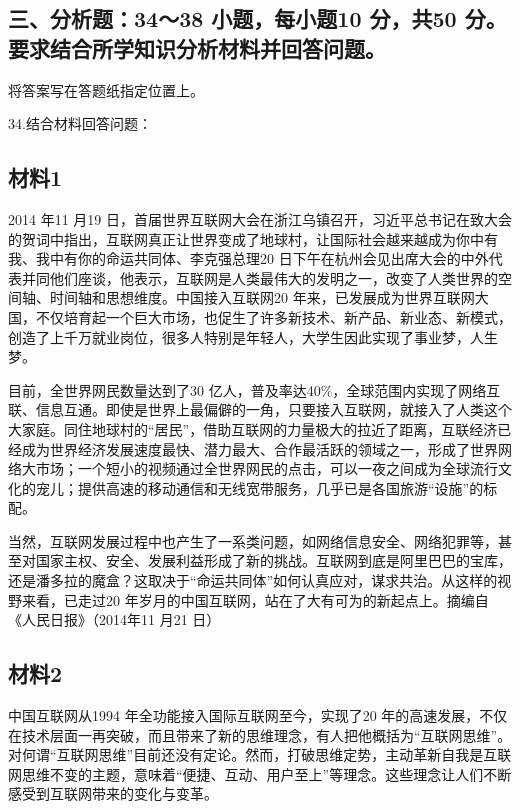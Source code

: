 \documentclass[UTF8,11pt]{ctexart}
\begin{document}
\subsection*{三、分析题：34～38 小题，每小题10 分，共50 分。要求结合所学知识分析材料并回答问题。}

将答案写在答题纸指定位置上。


34.结合材料回答问题：


\subsection*{材料1}

2014 年11 月19 日，首届世界互联网大会在浙江乌镇召开，习近平总书记在致大会的贺词中指出，互联网真正让世界变成了地球村，让国际社会越来越成为你中有我、我中有你的命运共同体、李克强总理20 日下午在杭州会见出席大会的中外代表并同他们座谈，他表示，互联网是人类最伟大的发明之一，改变了人类世界的空间轴、时间轴和思想维度。中国接入互联网20 年来，已发展成为世界互联网大国，不仅培育起一个巨大市场，也促生了许多新技术、新产品、新业态、新模式，创造了上千万就业岗位，很多人特别是年轻人，大学生因此实现了事业梦，人生梦。

目前，全世界网民数量达到了30 亿人，普及率达40\%，全球范围内实现了网络互联、信息互通。即使是世界上最偏僻的一角，只要接入互联网，就接入了人类这个大家庭。同住地球村的“居民”，借助互联网的力量极大的拉近了距离，互联经济已经成为世界经济发展速度最快、潜力最大、合作最活跃的领域之一，形成了世界网络大市场；一个短小的视频通过全世界网民的点击，可以一夜之间成为全球流行文化的宠儿；提供高速的移动通信和无线宽带服务，几乎已是各国旅游“设施”的标配。

当然，互联网发展过程中也产生了一系类问题，如网络信息安全、网络犯罪等，甚至对国家主权、安全、发展利益形成了新的挑战。互联网到底是阿里巴巴的宝库，还是潘多拉的魔盒？这取决于“命运共同体”如何认真应对，谋求共治。从这样的视野来看，已走过20 年岁月的中国互联网，站在了大有可为的新起点上。摘编自《人民日报》（2014年11 月21 日）

\subsection*{材料2}

中国互联网从1994 年全功能接入国际互联网至今，实现了20 年的高速发展，不仅在技术层面一再突破，而且带来了新的思维理念，有人把他概括为“互联网思维”。对何谓“互联网思维”目前还没有定论。然而，打破思维定势，主动革新自我是互联网思维不变的主题，意味着“便捷、互动、用户至上”等理念。这些理念让人们不断感受到互联网带来的变化与变革。
\end{document}
